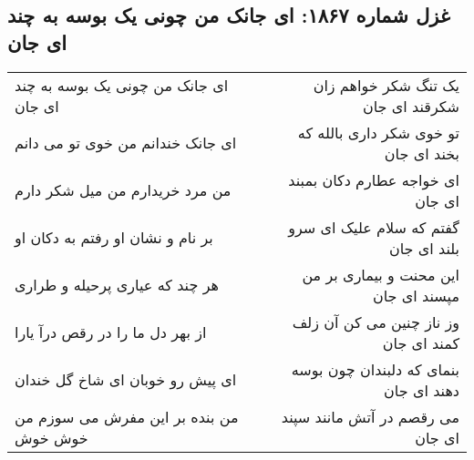 \begin{center}
\section*{غزل شماره ۱۸۶۷: ای جانک من چونی یک بوسه به چند ای جان}
\label{sec:1867}
\begin{longtable}{l p{0.5cm} r}
ای جانک من چونی یک بوسه به چند ای جان
&&
یک تنگ شکر خواهم زان شکرقند ای جان
\\
ای جانک خندانم من خوی تو می دانم
&&
تو خوی شکر داری بالله که بخند ای جان
\\
من مرد خریدارم من میل شکر دارم
&&
ای خواجه عطارم دکان بمبند ای جان
\\
بر نام و نشان او رفتم به دکان او
&&
گفتم که سلام علیک ای سرو بلند ای جان
\\
هر چند که عیاری پرحیله و طراری
&&
این محنت و بیماری بر من مپسند ای جان
\\
از بهر دل ما را در رقص درآ یارا
&&
وز ناز چنین می کن آن زلف کمند ای جان
\\
ای پیش رو خوبان ای شاخ گل خندان
&&
بنمای که دلبندان چون بوسه دهند ای جان
\\
من بنده بر این مفرش می سوزم من خوش خوش
&&
می رقصم در آتش مانند سپند ای جان
\\
\end{longtable}
\end{center}
